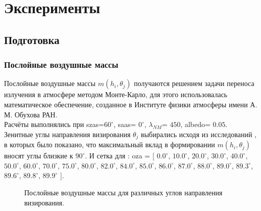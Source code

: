 \documentclass[a4paper,14pt]{article}
\theoremstyle{plain}
\theoremstyle{definition}
\theoremstyle{remark}
\newcommand{\nl}{\\ \indent}
\begin{document}
\section{Эксперименты}
\subsection{Подготовка}
\subsubsection{Послойные воздушные массы}
Послойные воздушные массы $m(h_i, \theta_j)$
получаются решением задачи переноса излучения в атмосфере 
методом Монте-Карло, для этого использовалась математическое
обеспечение, созданное в 
Институте физики атмосферы имени А. М. Обухова РАН.
\nl
Расчёты выполнялись при szas=$60^{\circ}$,  
saas= $0^{\circ}$,  
$\lambda_{NM}$= $450$,  
albedo= $0.05$. 
Зенитные углы направления визирования $\theta_j$ 
выбирались исходя из исследований \cite{litlink4}, 
в которых было показано, что максимальный
вклад в формировании $m(h_i, \theta_j)$ вносят углы 
близкие к $90^{\circ}$. 
И сетка для : oza = $[$ $0.0^{\circ}$, $10.0^{\circ}$,
$20.0^{\circ}$, $30.0^{\circ}$, $40.0^{\circ}$, $50.0^{\circ}$,
$60.0^{\circ}$, $70.0^{\circ}$, $75.0^{\circ}$, $80.0^{\circ}$,
$82.0^{\circ}$, $84.0^{\circ}$, $85.0^{\circ}$, $86.0^{\circ}$,
$87.0^{\circ}$, $88.0^{\circ}$, $89.0^{\circ}$, $89.3^{\circ}$,
$89.6^{\circ}$, $89.8^{\circ}$, $89.9^{\circ}$ $]$.
\begin{figure}[bh]
\noindent{}
\caption{Послойные воздушные массы для различных
углов направления визирования.}
\label{weights}
\end{figure}  
\end{document}

